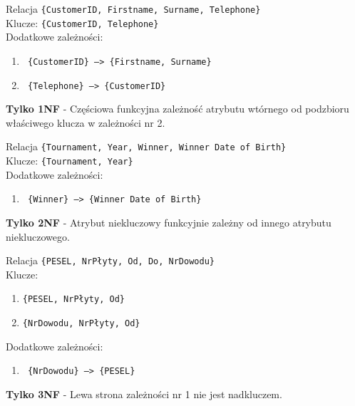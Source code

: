 \documentclass[a5paper,6pt]{article}
\begin{document}
    Relacja \texttt{\{CustomerID, Firstname, Surname, Telephone\}}\\
    Klucze: \texttt{\{CustomerID, Telephone\}}\\
    Dodatkowe zależności:
    \begin{enumerate}
        \item \texttt{ \{CustomerID\} --> \{Firstname, Surname\}}
        \item \texttt{ \{Telephone\} --> \{CustomerID\}}
    \end{enumerate}

    \begin{tcolorbox}
    \textbf{Tylko 1NF} - Częściowa funkcyjna zależność atrybutu wtórnego od
    podzbioru właściwego klucza w zależności nr 2.
    \end{tcolorbox}

\pagebreak

    Relacja \texttt{\{Tournament, Year, Winner, Winner Date of Birth\}}\\
    Klucze: \texttt{\{Tournament, Year\}}\\
    Dodatkowe zależności:
    \begin{enumerate}
        \item \texttt{ \{Winner\} --> \{Winner Date of Birth\}}
    \end{enumerate}

    \begin{tcolorbox}
    \textbf{Tylko 2NF} - Atrybut niekluczowy funkcyjnie zależny od innego
    atrybutu niekluczowego.
    \end{tcolorbox}

    \vskip 0.5cm
    Relacja \texttt{\{PESEL, NrPłyty, Od, Do, NrDowodu\}}\\
    Klucze:
    \begin{enumerate}
        \item \texttt{\{PESEL, NrPłyty, Od\}}
        \item \texttt{\{NrDowodu, NrPłyty, Od\}}
    \end{enumerate}

    Dodatkowe zależności:
    \begin{enumerate}
        \item \texttt{ \{NrDowodu\} --> \{PESEL\}}
    \end{enumerate}

    \begin{tcolorbox}
    \textbf{Tylko 3NF} - Lewa strona zależności nr 1 nie jest nadkluczem.
    \end{tcolorbox}
\end{document}
